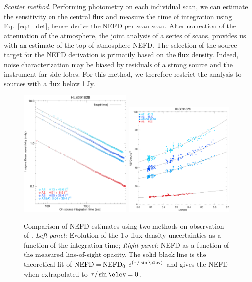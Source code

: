 \noindent \emph{Scatter method:} Performing photometry on each individual scan,
we can estimate the sensitivity on the central flux and measure the time of
integration using Eq.~\ref{eq:t_det}, hence derive the NEFD per scan
scan. After correction of the attenuation of the atmosphere, the joint analysis
of a series of scans,  provides us with
an estimate of the top-of-atmosphere NEFD. The selection of the source target
for the NEFD derivation is primarily based on the flux density. Indeed, noise
characterization may be biased by residuals of a strong source and the
instrument far side lobes. For this method, we therefore restrict the
analysis to sources with a flux below 1\,Jy.

\begin{figure}[!thbp]
  \begin{center}
    \includegraphics[trim={0.5cm, 0.5cm, 1.5cm, 1.8cm}, clip, angle=0, width=0.495\textwidth]{Figures/hls_nefd_vst.eps}
    \includegraphics[trim={0.5cm, 0, 0.2cm, 0.5cm}, clip, angle=0, width=0.485\textwidth]{Figures/hls_NEFD_vs_TauElev_all.eps}
    \caption{Comparison of NEFD estimates using two methods on
      observation of \hls. \emph{Left panel:} Evolution of the 1\,$\sigma$ flux density uncertainties as a function of the integration time; \emph{Right panel:} NEFD as a function of the measured line-of-sight opacity. The solid black line is the theoretical fit of $\rm{NEFD} = \rm{NEFD}_0$ $e^{(\tau/\sin\elev)}$ and gives the NEFD when extrapolated to $\tau/\sin\elev = 0$.}
    \label{fig:nefd_twomethods}
  \end{center}
\end{figure}

